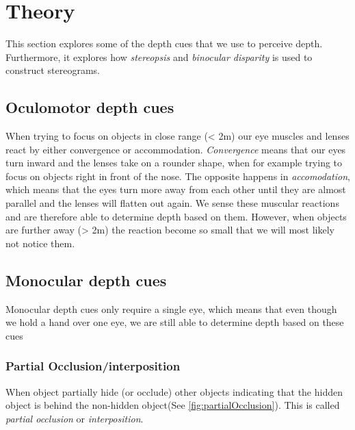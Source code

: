 \section{Theory}
This section explores some of the depth cues that we use to perceive depth. Furthermore, it explores how \textit{stereopsis} and \textit{binocular disparity} is used to construct stereograms.

\subsection{Oculomotor depth cues}
When trying to focus on objects in close range (< 2m) our eye muscles and lenses react by either convergence or accommodation. \textit{Convergence} means that our eyes turn inward and the lenses take on a rounder shape, when for example trying to focus on objects right in front of the nose. The opposite happens in \textit{accomodation}, which means that the eyes turn more away from each other until they are almost parallel and the lenses will flatten out again. We sense these muscular reactions and are therefore able to determine depth based on them. However, when objects are further away (> 2m) the reaction become so small that we will most likely not notice them\citep{sensationPerception}.

\subsection{Monocular depth cues}
Monocular depth cues only require a single eye, which means that even though we hold a hand over one eye, we are still able to determine depth based on these cues\citep{sensationPerception}

\subsubsection{Partial Occlusion/interposition}
When object partially hide (or occlude) other objects indicating that the hidden object is behind the non-hidden object(See \autoref{fig:partialOcclusion}). This is called \textit{partial occlusion} or \textit{interposition}\citep{sensationPerception}.

